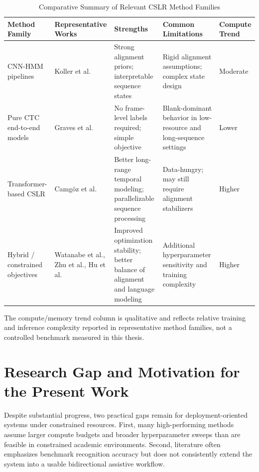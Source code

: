 \begin{table}[H]
\centering
\caption{Comparative Summary of Relevant CSLR Method Families}
\label{tab:lit_compare}
\begingroup
\small
\setlength{\tabcolsep}{4pt}
\begin{tabularx}{\textwidth}{@{}p{2.1cm}p{2.5cm}X X p{1.7cm}@{}}
\toprule
\textbf{Method Family} & \textbf{Representative Works} & \textbf{Strengths} & \textbf{Common Limitations} & \textbf{Compute Trend} \\
\midrule
CNN-HMM pipelines & Koller et al.\cite{koller2015continuous} & Strong alignment priors; interpretable sequence states & Rigid alignment assumptions; complex state design & Moderate \\

Pure CTC end-to-end models & Graves et al.\cite{graves2006connectionist} & No frame-level labels required; simple objective & Blank-dominant behavior in low-resource and long-sequence settings & Lower \\

Transformer-based CSLR & Camgöz et al.\cite{camgoz2020sign} & Better long-range temporal modeling; parallelizable sequence processing & Data-hungry; may still require alignment stabilizers & Higher \\

Hybrid / constrained objectives & Watanabe et al.,\cite{watanabe2017hybrid} Zhu et al.,\cite{zhu2021visual} Hu et al.\cite{hu2023continuous} & Improved optimization stability; better balance of alignment and language modeling & Additional hyperparameter sensitivity and training complexity & Higher \\
\bottomrule
\end{tabularx}
\endgroup
\end{table}

\noindent The compute/memory trend column is qualitative and reflects relative training and inference complexity reported in representative method families, not a controlled benchmark measured in this thesis.

\section{Research Gap and Motivation for the Present Work}

Despite substantial progress, two practical gaps remain for deployment-oriented systems under constrained resources. First, many high-performing methods assume larger compute budgets and broader hyperparameter sweeps than are feasible in constrained academic environments. Second, literature often emphasizes benchmark recognition accuracy but does not consistently extend the system into a usable bidirectional assistive workflow.


